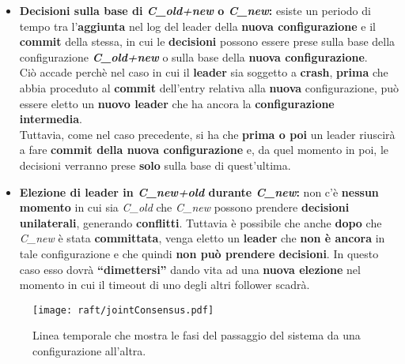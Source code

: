 \begin{itemize}
      \item{\textbf{Decisioni sulla base di \textit{C\_old+new} o \textit{C\_new}:} esiste un periodo di tempo tra l'\textbf{aggiunta} nel log del leader della \textbf{nuova configurazione} e il \textbf{commit} della stessa, in cui le \textbf{decisioni} possono essere prese sulla base della configurazione \textit{\textbf{C\_old+new}} o sulla base della \textbf{nuova configurazione}. \\
      Ciò accade perchè nel caso in cui il \textbf{leader} sia soggetto a \textbf{crash}, \textbf{prima} che abbia proceduto al \textbf{commit} dell'entry relativa alla \textbf{nuova} configurazione, può essere eletto un \textbf{nuovo leader} che ha ancora la \textbf{configurazione intermedia}.\\
      Tuttavia, come nel caso precedente, si ha che \textbf{prima o poi} un leader riuscirà a fare \textbf{commit della nuova configurazione} e, da quel momento in poi, le decisioni verranno prese \textbf{solo} sulla base di quest'ultima.} 

      \item{\textbf{Elezione di leader in \textit{C\_new+old} durante\textit{ C\_new}:} non c'è \textbf{nessun momento} in cui sia \textit{C\_old} che \textit{C\_new} possono prendere \textbf{decisioni unilaterali}, generando \textbf{conflitti}. Tuttavia è possibile che anche \textbf{dopo} che \textit{C\_new} è stata \textbf{committata}, venga eletto un \textbf{leader} che \textbf{non è ancora} in tale configurazione e che quindi \textbf{non può prendere decisioni}. In questo caso esso dovrà \textbf{``dimettersi''} dando vita ad una \textbf{nuova elezione} nel momento in cui il timeout di uno degli altri follower scadrà. } 

    \end{itemize}

  \begin{figure}[H]
    \centering
    \texttt{[image: raft/jointConsensus.pdf]}
    \caption{Linea temporale che mostra le fasi del passaggio del sistema da una configurazione all'altra.}
    \label{fig:figure 9}
  \end{figure}

